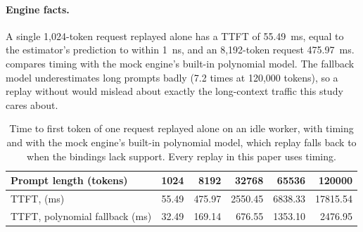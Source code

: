 \paragraph{Engine facts.}
A single 1,024-token request replayed alone has a TTFT of \SI{55.49}{ms}, equal to the \ais{}
estimator's prediction to within \SI{1}{ns}, and an 8,192-token request \SI{475.97}{ms}.
 compares \ais{} timing with the mock engine's built-in polynomial model. The
fallback model underestimates long prompts badly (7.2 times at 120,000 tokens), so a replay
without \ais{} would mislead about exactly the long-context traffic this study cares about.

\begin{table}[tbp]
  \centering\small
  \caption{Time to first token of one request replayed alone on an idle worker, with \ais{} timing
    and with the mock engine's built-in polynomial model, which replay falls back to when the
    bindings lack \ais{} support. Every replay in this paper uses \ais{} timing.}
  \label{tab:engine-ttft}
  \begin{tabular}{@{}lrrrrr@{}}
    \toprule
    Prompt length (tokens) & \num{1024} & \num{8192} & \num{32768} & \num{65536} & \num{120000} \\
    \midrule
    TTFT, \ais{} (ms) & 55.49 & 475.97 & \num{2550.45} & \num{6838.33} & \num{17815.54} \\
    TTFT, polynomial fallback (ms) & 32.49 & 169.14 & 676.55 & \num{1353.10} & \num{2476.95} \\
    \bottomrule
  \end{tabular}
\end{table}

